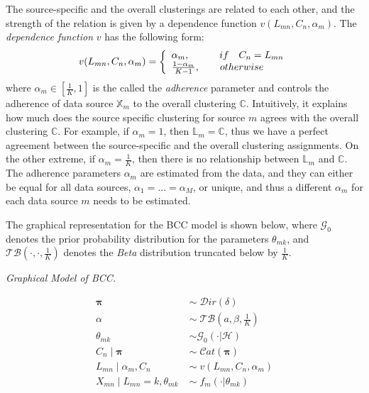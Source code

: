 The source-specific and the overall clusterings are related to each other, and the strength of the relation is given by a dependence function $v(L_{mn}, C_{n}, \alpha_{m})$. The \emph{dependence function} $v$ has the following form:
\begin{equation}
	v(L_{mn}, C_{n}, \alpha_{m}) = \left\{
	\begin{array}{l l}
		\alpha_{m},\quad \quad \quad if\quad C_{n} = L_{mn}\\
		\frac{1-\alpha_{m}}{K-1},\quad \quad otherwise
	\end{array}\right.
\end{equation}
where $\alpha_{m} \in [\frac{1}{K}, 1]$ is the called the \emph{adherence} parameter and controls the adherence of data source $\mathbb{X}_m$ to the overall clustering $\mathbb{C}$. Intuitively, it explains how much does the source specific clustering for source $m$ agrees with the overall clustering $\mathbb{C}$. For example, if $\alpha_{m} = 1$, then $\mathbb{L}_{m} = \mathbb{C}$, thus we have a perfect agreement between the source-specific and the overall clustering assignments. On the other extreme, if $\alpha_{m} = \frac{1}{K}$, then there is no relationship between $\mathbb{L}_{m}$ and $\mathbb{C}$. The adherence parameters $\alpha_{m}$ are estimated from the data, and they can either be equal for all data sources, \ie $\alpha_{1} = ... = \alpha_{M}$, or unique, and thus a different $\alpha_{m}$ for each data source $m$ needs to be estimated. 


The graphical representation for the BCC model is shown below, where $\mathcal{G}_{0}$ denotes the prior probability distribution for the parameters $\theta_{mk}$, and $\mathcal{TB}(\cdot, \cdot, \frac{1}{K})$ denotes the \emph{Beta} distribution truncated below by $\frac{1}{K}$.

\vspace*{5mm}
\begin{minipage}{0.5\textwidth}%
  \hfill
  \begin{center}
	
	\emph{Graphical Model of BCC.}
  \end{center}
\end{minipage}
\begin{minipage}{0.4\textwidth}%
  \begin{equation*}
  	\begin{aligned}
  		\mathbf{\pi} \; & \sim \; \mathcal{D}ir(\delta) \\
  		\alpha \; & \sim \; \mathcal{TB}(\mathit{a}, \beta, \frac{1}{K}) \\
  		\theta_{mk} \; & \sim \mathcal{G}_{0}(\cdot | \mathcal{H}) \\
  		C_{n} \mid \mathbf{\pi} \; & \sim \; \mathcal{C}at(\mathbf{\pi}) \\
  		L_{mn} \mid \alpha_{m}, C_{n} \; & \sim \; v(L_{mn}, C_{n}, \alpha_{m}) \\
  		X_{mn} \mid L_{mn}=k,\theta_{mk} \; & \sim \; f_{m}(\cdot | \theta_{mk}) 
  	\end{aligned} 
  \end{equation*} 
\end{minipage}
\vspace*{5mm}


